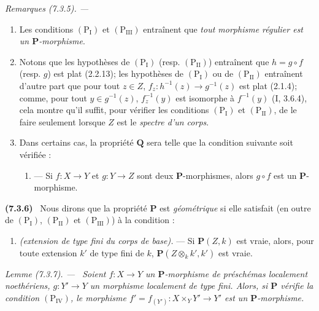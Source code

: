 \documentclass[10pt,oneside]{book}
\newcommand{\oldpage}[2][]{%
  \setcounter{footnote}{0}%
  \marginpar{\scriptsize\textbf{#1}~|~#2}\ignorespaces}
\newenvironment{env}[1][]{\par\medskip\noindent\textbf{(#1)}\ }{\par}
\newenvironment{remarks}[1][]{%
  \par\medskip\noindent\itshape Remarques (#1). ---\ }{\par}
\newenvironment{lemma}[1][]{%
  \par\medskip\noindent\itshape Lemme (#1). ---\ }{\par}
\begin{document}
\begin{remarks}[7.3.5]
\label{IV.2.s7.3.5-fr}
\begin{enumerate}
\item[\emph{i)}] Les conditions $(\mathrm P_{\mathrm I})$ et
$(\mathrm P_{\mathrm{III}})$ entraînent que \emph{tout morphisme régulier
est un $\boldsymbol P$-morphisme}.
\item[\emph{ii)}] Notons que les hypothèses de $(\mathrm P_{\mathrm I})$
(resp. $(\mathrm P_{\mathrm{II}})$) entraînent que $h=g\circ f$ (resp.
$g$) est plat (2.2.13); les hypothèses de $(\mathrm P_{\mathrm I})$ ou de
$(\mathrm P_{\mathrm{II}})$ entraînent d'autre part que pour tout
$z\in Z$, $f_z:h^{-1}(z)\to g^{-1}(z)$ est plat (2.1.4); comme, pour tout
$y\in g^{-1}(z)$, $f_z^{-1}(y)$ est isomorphe à $f^{-1}(y)$ (I, 3.6.4),
cela montre qu'il suffit, pour vérifier les conditions
$(\mathrm P_{\mathrm I})$ et $(\mathrm P_{\mathrm{II}})$, de le faire
seulement lorsque $Z$ est le \emph{spectre d'un corps}.
\item[\emph{iii)}] Dans certains cas, la propriété $\boldsymbol Q$ sera telle que la
condition suivante soit vérifiée :
\begin{enumerate}
\item[$(\mathrm P'_{\mathrm I})$] --- Si $f:X\to Y$ et $g:Y\to Z$ sont
deux $\boldsymbol P$-morphismes, alors $g\circ f$ est un
$\boldsymbol P$-morphisme.
\end{enumerate}
\end{enumerate}
\end{remarks}

\oldpage[IV-2]{194}

\begin{env}[7.3.6]
\label{IV.2.s7.3.6-fr}
Nous dirons que la propriété $\boldsymbol P$ est \emph{géométrique} si elle
satisfait (en outre de $(\mathrm P_{\mathrm I})$,
$(\mathrm P_{\mathrm{II}})$ et $(\mathrm P_{\mathrm{III}})$) à la
condition :
\begin{enumerate}
\item[$(\mathrm P_{\mathrm{IV}})$] \emph{(extension de type fini du corps
de base).} --- Si $\boldsymbol P(Z,k)$ est vraie, alors, pour toute
extension $k'$ de type fini de $k$,
$\boldsymbol P(Z\otimes_k k',k')$ est vraie.
\end{enumerate}
\end{env}

\begin{lemma}[7.3.7]
\label{IV.2.s7.3.7-fr}
Soient $f:X\to Y$ un $\boldsymbol P$-morphisme de préschémas localement
noethériens, $g:Y'\to Y$ un morphisme localement de type fini. Alors, si
$\boldsymbol P$ vérifie la condition $(\mathrm P_{\mathrm{IV}})$, le
morphisme $f'=f_{(Y')}:X\times_Y Y'\to Y'$ est un
$\boldsymbol P$-morphisme.
\end{lemma}
\end{document}

